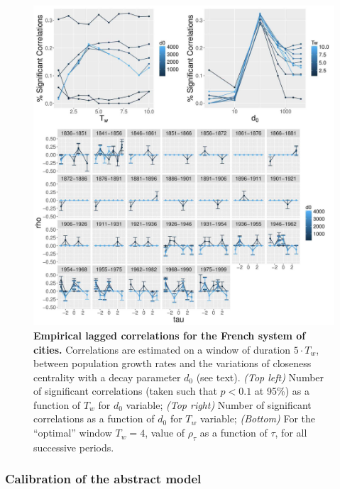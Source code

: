 \begin{figure}
	\includegraphics[width=\linewidth]{figures/6-2-3-fig-macrocoevol-empirical.jpg}
	\caption[Empirical lagged correlations for the French system of cities]{\textbf{Empirical lagged correlations for the French system of cities.} Correlations are estimated on a window of duration $5\cdot T_w$, between population growth rates and the variations of closeness centrality with a decay parameter $d_0$ (see text). \textit{(Top left)} Number of significant correlations (taken such that $p<0.1$ at 95\%) as a function of $T_w$ for $d_0$ variable; \textit{(Top right)} Number of significant correlations as a function of $d_0$ for $T_w$ variable; \textit{(Bottom)} For the ``optimal'' window $T_w = 4$, value of $\rho_{\tau}$ as a function of $\tau$, for all successive periods.\label{fig:macrocoevol:empirical}}
\end{figure}


\subsubsection{Calibration of the abstract model}


